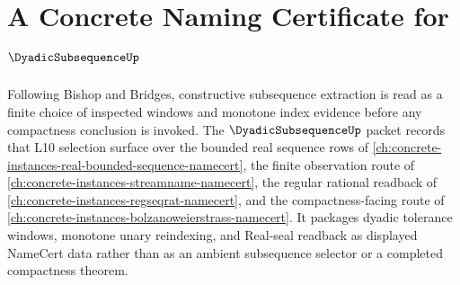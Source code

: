 \chapter{A Concrete Naming Certificate for $\DyadicSubsequenceUp$}
\label{ch:concrete-instances-dyadic-subsequence-namecert}

Following Bishop and Bridges, constructive subsequence extraction is read as a finite choice of inspected windows and monotone index evidence before any compactness conclusion is invoked. The $\DyadicSubsequenceUp$ packet records that L10 selection surface over the bounded real sequence rows of \autoref{ch:concrete-instances-real-bounded-sequence-namecert}, the finite observation route of \autoref{ch:concrete-instances-streamname-namecert}, the regular rational readback of \autoref{ch:concrete-instances-regseqrat-namecert}, and the compactness-facing route of \autoref{ch:concrete-instances-bolzanoweierstrass-namecert}. It packages dyadic tolerance windows, monotone unary reindexing, and Real-seal readback as displayed NameCert data rather than as an ambient subsequence selector or a completed compactness theorem.

